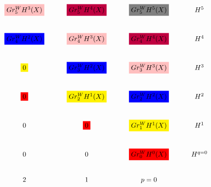 \documentclass[../main.tex]{subfiles}
\begin{document}
\begin{remark}
$$\begin{tikzcd}
\colorbox{pink}{$Gr_{5}^{W}H^{3}(X)$}&\colorbox{purple}{$Gr_{5}^{W}H^{4}(X)$} & \colorbox{gray}{$Gr_{5}^{W}H^{5}(X)$} & H^{5}\\
\colorbox{blue}{$Gr_{4}^{W}H^{2}(X)$} & \colorbox{pink}{$Gr_{4}^{W}H^{3}(X)$}& \colorbox{purple}{$Gr_{4}^{W}H^{4}(X)$} & H^{4}\\
\colorbox{yellow}{$0$} & \colorbox{blue}{$Gr_{3}^{W}H^{2}(X)$} & \colorbox{pink}{$Gr_{3}^{W}H^{3}(X)$} & H^{3}\\
\colorbox{red}{$0$} & \colorbox{yellow}{$Gr_{2}^{W}H^{1}(X)$} & \colorbox{blue}{$Gr_{2}^{W}H^{2}(X)$}& H^{2}\\
0 & \colorbox{red}{$0$} & \colorbox{yellow}{$Gr_{1}^{W}H^{1}(X)$} & H^{1}\\
0 &  0 & \colorbox{red}{$Gr_{0}^{W}H^{0}(X)$} & H^{q=0}\\
2 & 1 & p=0 & \\
\end{tikzcd}$$

\end{remark}
\begin{remark}

\end{remark}
\end{document}

